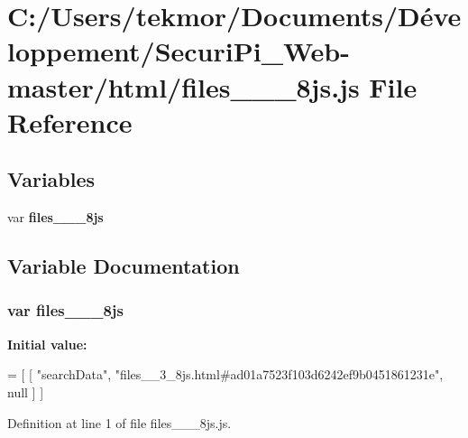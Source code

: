 \section{C\+:/\+Users/tekmor/\+Documents/\+Développement/\+Securi\+Pi\+\_\+\+Web-\/master/html/files\+\_\+\+\_\+\_\+8js.js File Reference}
\label{files____3__8js_8js}
\subsection*{Variables}
\begin{DoxyCompactItemize}
\item 
var {\bf files\+\_\+\+\_\+\_\+8js}
\end{DoxyCompactItemize}


\subsection{Variable Documentation}
\subsubsection[{files\+\_\+\+\_\+3\+\_\+8js}]{\setlength{\rightskip}{0pt plus 5cm}var files\+\_\+\+\_\+\_\+8js}\label{files____3__8js_8js_a9da315fc845310b78ad854a993566331}
{\bfseries Initial value\+:}
\begin{DoxyCode}
=
[
    [ \textcolor{stringliteral}{"searchData"}, \textcolor{stringliteral}{"files\_\_3\_8js.html#ad01a7523f103d6242ef9b0451861231e"}, null ]
]
\end{DoxyCode}


Definition at line 1 of file files\+\_\+\+\_\+\_\+8js.\+js.

